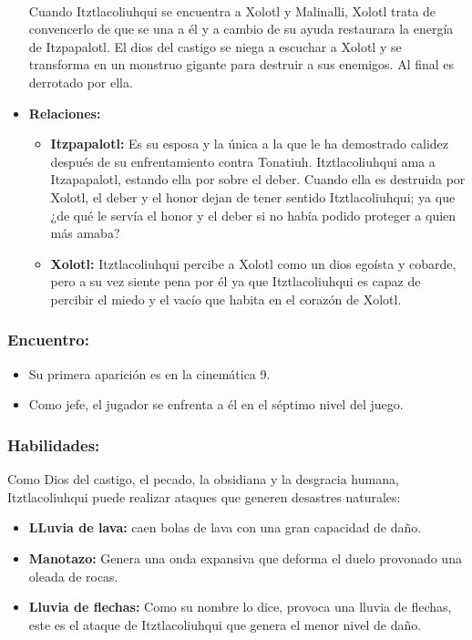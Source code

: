 \documentclass[11pt,letterpaper]{article}
\begin{document}
\begin{itemize}
	\\
	\par
	Cuando Itztlacoliuhqui se encuentra a Xolotl y Malinalli, Xolotl trata de convencerlo de que se una a él y a cambio de su ayuda restaurara la energía de Itzpapalotl. El dios del castigo se niega a escuchar a Xolotl y se transforma en un monstruo gigante para destruir a sus enemigos. Al final es derrotado por ella.
	\item \textbf{Relaciones:}
	\begin{itemize}
		\item \textbf{Itzpapalotl:} Es su esposa y la única a la que le ha demostrado calidez después de su enfrentamiento contra Tonatiuh. Itztlacoliuhqui ama a Itzapapalotl, estando ella por sobre el deber. Cuando ella es destruida por Xolotl, el deber y el honor dejan de tener sentido Itztlacoliuhqui; ya que ¿de qué le servía el honor y el deber si no había podido proteger a quien más amaba?
		\item \textbf{Xolotl: } Itztlacoliuhqui percibe a Xolotl como un dios egoísta y cobarde, pero a su vez siente pena por él ya que Itztlacoliuhqui es capaz de percibir el miedo y el vacío que habita en el corazón de Xolotl. 
	\end{itemize}			  
\end{itemize}

\subsubsection{Encuentro:}
\begin{itemize}
	\item Su primera aparición es en la cinemática 9.
	\item Como jefe, el jugador se enfrenta a él en el séptimo nivel del juego.
\end{itemize} 

\subsubsection{Habilidades:}
Como Dios del castigo, el pecado, la obsidiana y la desgracia humana, Itztlacoliuhqui puede realizar ataques que generen desastres naturales:
\begin{itemize}
	\item \textbf{LLuvia de lava:} caen bolas de lava con una gran capacidad de daño.
	\item \textbf{Manotazo:} Genera una onda expansiva que deforma el duelo provonado una oleada de rocas.
	\item \textbf{Lluvia de flechas:} Como su nombre lo dice, provoca una lluvia de flechas, este es el ataque de Itztlacoliuhqui que genera el menor nivel de daño. 
\end{itemize}
\end{document}

